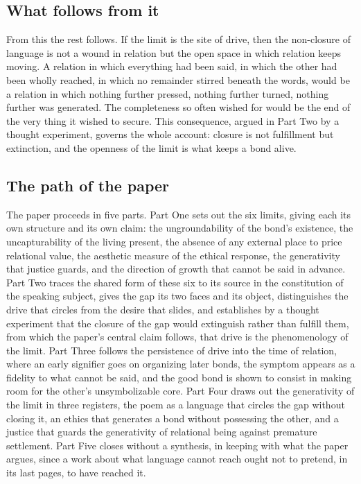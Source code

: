 \subsection*{What follows from it}

From this the rest follows. If the limit is the site of drive, then the non-closure of language is not a wound in relation but the open space in which relation keeps moving. A relation in which everything had been said, in which the other had been wholly reached, in which no remainder stirred beneath the words, would be a relation in which nothing further pressed, nothing further turned, nothing further was generated. The completeness so often wished for would be the end of the very thing it wished to secure. This consequence, argued in Part Two by a thought experiment, governs the whole account: closure is not fulfillment but extinction, and the openness of the limit is what keeps a bond alive.

\subsection*{The path of the paper}

The paper proceeds in five parts. Part One sets out the six limits, giving each its own structure and its own claim: the ungroundability of the bond's existence, the uncapturability of the living present, the absence of any external place to price relational value, the aesthetic measure of the ethical response, the generativity that justice guards, and the direction of growth that cannot be said in advance. Part Two traces the shared form of these six to its source in the constitution of the speaking subject, gives the gap its two faces and its object, distinguishes the drive that circles from the desire that slides, and establishes by a thought experiment that the closure of the gap would extinguish rather than fulfill them, from which the paper's central claim follows, that drive is the phenomenology of the limit. Part Three follows the persistence of drive into the time of relation, where an early signifier goes on organizing later bonds, the symptom appears as a fidelity to what cannot be said, and the good bond is shown to consist in making room for the other's unsymbolizable core. Part Four draws out the generativity of the limit in three registers, the poem as a language that circles the gap without closing it, an ethics that generates a bond without possessing the other, and a justice that guards the generativity of relational being against premature settlement. Part Five closes without a synthesis, in keeping with what the paper argues, since a work about what language cannot reach ought not to pretend, in its last pages, to have reached it.

